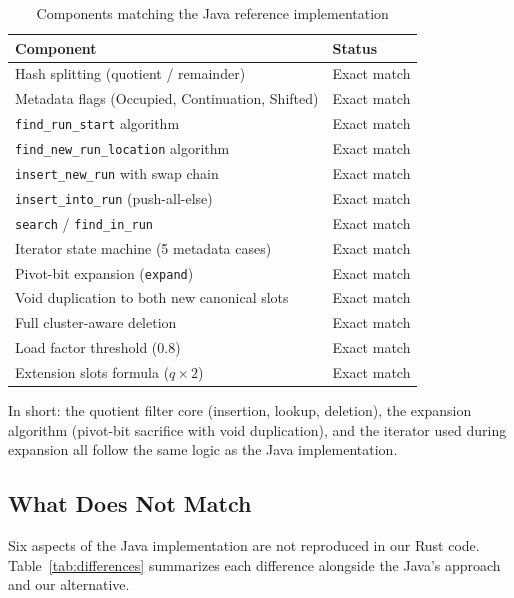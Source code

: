 \begin{table}[H]
  \centering
  \caption{Components matching the Java reference implementation}
  \label{tab:matching}
  \begin{tabular}{l l}
    \hline
    \textbf{Component} & \textbf{Status} \\
    \hline
    Hash splitting (quotient / remainder)        & Exact match \\
    Metadata flags (Occupied, Continuation, Shifted) & Exact match \\
    \texttt{find\_run\_start} algorithm          & Exact match \\
    \texttt{find\_new\_run\_location} algorithm  & Exact match \\
    \texttt{insert\_new\_run} with swap chain    & Exact match \\
    \texttt{insert\_into\_run} (push-all-else)   & Exact match \\
    \texttt{search} / \texttt{find\_in\_run}     & Exact match \\
    Iterator state machine (5 metadata cases)    & Exact match \\
    Pivot-bit expansion (\texttt{expand})         & Exact match \\
    Void duplication to both new canonical slots  & Exact match \\
    Full cluster-aware deletion                   & Exact match \\
    Load factor threshold ($0.8$)                 & Exact match \\
    Extension slots formula ($q \times 2$)        & Exact match \\
    \hline
  \end{tabular}
\end{table}

In short: the quotient filter core (insertion, lookup, deletion), the expansion algorithm (pivot-bit sacrifice with void duplication), and the iterator used during expansion all follow the same logic as the Java implementation.

\subsection{What Does Not Match}

Six aspects of the Java implementation are not reproduced in our Rust code. Table~\ref{tab:differences} summarizes each difference alongside the Java's approach and our alternative.


